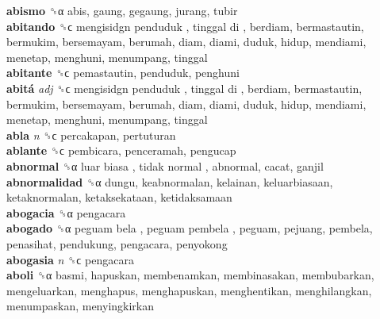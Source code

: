 \textbf{abismo} ␝α  abis, gaung, gegaung, jurang, tubir  \\
\textbf{abitando} ␝ϲ   mengisidgn penduduk ,  tinggal di , berdiam, bermastautin, bermukim, bersemayam, berumah, diam, diami, duduk, hidup, mendiami, menetap, menghuni, menumpang, tinggal  \\
\textbf{abitante} ␝ϲ  pemastautin, penduduk, penghuni  \\
\textbf{abitá} \emph{adj}  ␝ϲ   mengisidgn penduduk ,  tinggal di , berdiam, bermastautin, bermukim, bersemayam, berumah, diam, diami, duduk, hidup, mendiami, menetap, menghuni, menumpang, tinggal  \\
\textbf{abla} \emph{n}  ␝ϲ  percakapan, pertuturan  \\
\textbf{ablante} ␝ϲ  pembicara, penceramah, pengucap  \\
\textbf{abnormal} ␝α   luar biasa ,  tidak normal , abnormal, cacat, ganjil  \\
\textbf{abnormalidad} ␝α  dungu, keabnormalan, kelainan, keluarbiasaan, ketaknormalan, ketaksekataan, ketidaksamaan  \\
\textbf{abogacia} ␝α  pengacara  \\
\textbf{abogado} ␝α   peguam bela ,  peguam pembela , peguam, pejuang, pembela, penasihat, pendukung, pengacara, penyokong  \\
\textbf{abogasia} \emph{n}  ␝ϲ  pengacara  \\
\textbf{aboli} ␝α  basmi, hapuskan, membenamkan, membinasakan, membubarkan, mengeluarkan, menghapus, menghapuskan, menghentikan, menghilangkan, menumpaskan, menyingkirkan  \\
